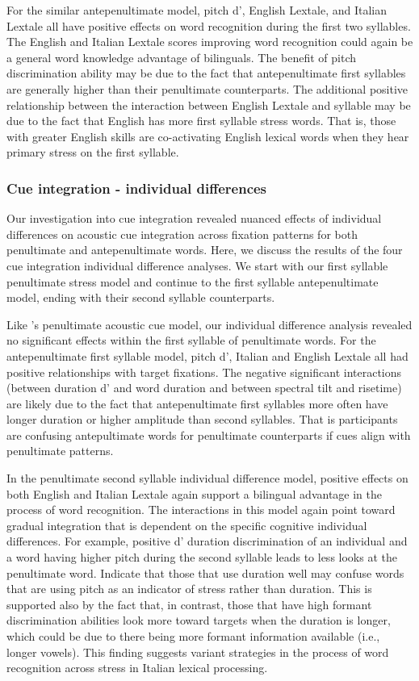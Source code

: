 For the similar antepenultimate model, pitch d', English Lextale, and Italian Lextale all have positive effects on word recognition during the first two syllables. The English and Italian Lextale scores improving word recognition could again be a general word knowledge advantage of bilinguals. The benefit of pitch discrimination ability may be due to the fact that antepenultimate first syllables are generally higher than their penultimate counterparts. The additional positive relationship between the interaction between English Lextale and syllable may be due to the fact that English has more first syllable stress words. That is, those with greater English skills are co-activating English lexical words when they hear primary stress on the first syllable.

\subsubsection{Cue integration - individual differences}
Our investigation into cue integration revealed nuanced effects of individual differences on acoustic cue integration across fixation patterns for both penultimate and antepenultimate words. Here, we discuss the results of the four cue integration individual difference analyses. We start with our first syllable penultimate stress model and continue to the first syllable antepenultimate model, ending with their second syllable counterparts.

Like \cite{Sulpizio_McQueen_2012}'s penultimate acoustic cue model, our individual difference analysis revealed no significant effects within the first syllable of penultimate words. For the antepenultimate first syllable model, pitch d', Italian and English Lextale all had positive relationships with target fixations. The negative significant interactions (between duration d' and word duration and between spectral tilt and risetime) are likely due to the fact that antepenultimate first syllables more often have longer duration or higher amplitude than second syllables. That is participants are confusing antepultimate words for penultimate counterparts if cues align with penultimate patterns.

In the penultimate second syllable individual difference model, positive effects on both English and Italian Lextale again support a bilingual advantage in the process of word recognition. The interactions in this model again point toward gradual integration that is dependent on the specific cognitive individual differences. For example, positive d' duration discrimination of an individual and a word having higher pitch during the second syllable leads to less looks at the penultimate word. Indicate that those that use duration well may confuse words that are using pitch as an indicator of stress rather than duration. This is supported also by the fact that, in contrast, those that have high formant discrimination abilities look more toward targets when the duration is longer, which could be due to there being more formant information available (i.e., longer vowels). This finding suggests variant strategies in the process of word recognition across stress in Italian lexical processing.

